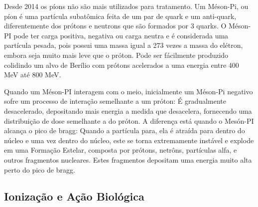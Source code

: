 \documentclass[11pt,a4paper]{article}
\begin{document}
            Desde 2014 os píons não são mais utilizados para tratamento. Um Méson-Pi, ou píon é uma partícula subatômica feita de um par de quark e um anti-quark, diferentemente dos prótons e neutrons que são formados por 3 quarks.  O Méson-PI pode ter carga positiva, negativa ou carga neutra e é considerada uma partícula pesada, pois possui uma massa igual a 273 vezes a massa do elétron, embora seja muito mais leve que o próton. Pode ser fácilmente produzido colidindo um alvo de Berílio com prótons acelerados a uma energia entre 400 MeV até 800 MeV. 

            Quando um Méson-PI interagem com o meio, inicialmente um Méson-Pi negativo sofre um processo de interação semelhante a um próton: É gradualmente desacelerado, depositando mais energia a medida que desacelera, fornecendo uma distribuição de dose semelhante a do próton. A diferença está quando o Mesón-PI alcança o pico de bragg: Quando a partícula para, ela é atraída para dentro do núcleo e uma vez dentro do núcleo, este se torna extremamente instável e explode em uma Formação Estelar, composta por prótons, netrôns, partículas alfa, e outros fragmentos nucleares. Estes fragmentos depositam uma energia muito alta perto do pico de bragg.
            
        \subsection{Ionização e Ação Biológica}
\end{document}
